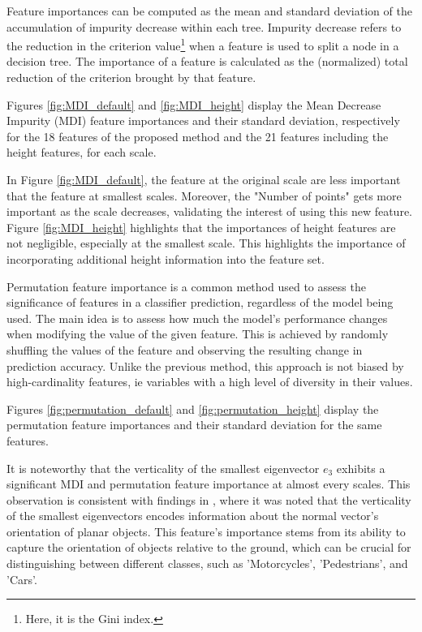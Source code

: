 \documentclass{article}
\begin{document}
Feature importances can be computed as the mean and standard deviation of the accumulation of impurity decrease within each tree. Impurity decrease refers to the reduction in the criterion value\footnote{Here, it is the Gini index.} when a feature is used to split a node in a decision tree. The importance of a feature is calculated as the (normalized) total reduction of the criterion brought by that feature.

Figures \ref{fig:MDI_default} and \ref{fig:MDI_height} display the Mean Decrease Impurity (MDI) feature importances and their standard deviation, respectively for the 18 features of the proposed method \cite{thomas_semantic_2018} and the 21 features including the height features, for each scale. 

In Figure \ref{fig:MDI_default}, the feature at the original scale are less important that the feature at smallest scales. Moreover, the "Number of points" gets more important as the scale decreases, validating the interest of using this new feature. Figure \ref{fig:MDI_height} highlights that the importances of height features are not negligible, especially at the smallest scale. This highlights the importance of incorporating additional height information into the feature set.

Permutation feature importance is a common method used to assess the significance of features in a classifier prediction, regardless of the model being used. The main idea is to assess how much the model's performance changes when modifying the value of the given feature. This is achieved by randomly shuffling the values of the feature and observing the resulting change in prediction accuracy.
Unlike the previous method, this approach is not biased by high-cardinality features, ie variables with a high level of diversity in their values.

Figures \ref{fig:permutation_default} and \ref{fig:permutation_height} display the permutation feature importances and their standard deviation for the same features. 

It is noteworthy that the verticality of the smallest eigenvector $e_3$ exhibits a significant MDI and permutation feature importance at almost every scales. This observation is consistent with findings in \cite{thomas_semantic_2018}, where it was noted that the verticality of the smallest eigenvectors encodes information about the normal vector's orientation of planar objects. This feature's importance stems from its ability to capture the orientation of objects relative to the ground, which can be crucial for distinguishing between different classes, such as 'Motorcycles', 'Pedestrians', and 'Cars'.
\end{document}
